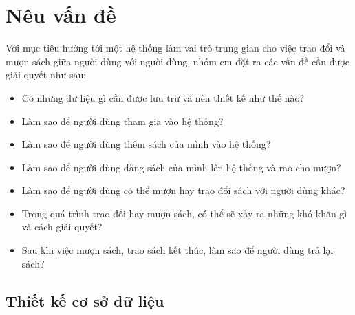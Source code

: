 \documentclass[../thesis.tex]{subfiles}
\begin{document}
\section{Nêu vấn đề}

	Với mục tiêu hướng tới một hệ thống làm vai trò trung gian cho việc trao đổi và mượn sách giữa người dùng với người dùng, nhóm em đặt ra các vấn đề cần được giải quyết như sau:
	\begin{itemize}
		\item Có những dữ liệu gì cần được lưu trữ và nên thiết kế như thế nào?
		\item Làm sao để người dùng tham gia vào hệ thống?
		\item Làm sao để người dùng thêm sách của mình vào hệ thống?
		\item Làm sao để người dùng đăng sách của mình lên hệ thống và rao cho mượn?
		\item Làm sao để người dùng có thể mượn hay trao đổi sách với người dùng khác?
		\item Trong quá trình trao đổi hay mượn sách, có thể sẽ xảy ra những khó khăn gì và cách giải quyết?
		\item Sau khi việc mượn sách, trao sách kết thúc, làm sao để người dùng trả lại sách?
	\end{itemize}

	\subsection{Thiết kế cơ sở dữ liệu}
	
\end{document}
